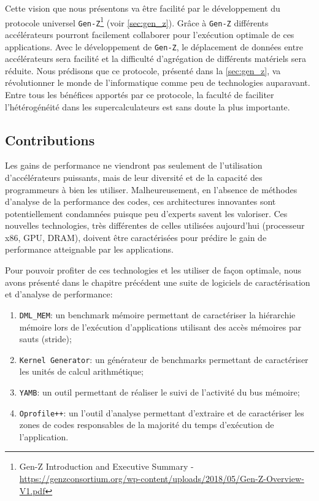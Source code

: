         
        Cette vision que nous présentons va être facilité par le développement du protocole universel \verb|Gen-Z|\footnote{Gen-Z Introduction and Executive Summary - \url{https://genzconsortium.org/wp-content/uploads/2018/05/Gen-Z-Overview-V1.pdf}} (voir \autoref{sec:gen_z}). Grâce à \verb|Gen-Z| différents accélérateurs pourront facilement collaborer pour l'exécution optimale de ces applications. Avec le développement de \verb=Gen-Z=, le déplacement de données entre accélérateurs sera facilité et la difficulté d'agrégation de différents matériels sera réduite. Nous prédisons que ce protocole, présenté dans la \autoref{sec:gen_z}, va révolutionner le monde de l'informatique comme peu de technologies auparavant. Entre tous les bénéfices apportés par ce protocole, la faculté de faciliter l'hétérogénéité dans les supercalculateurs est sans doute la plus importante. 

\subsection{Contributions}

       Les gains de performance ne viendront pas seulement de l'utilisation d'accélérateurs puissants, mais de leur diversité et de la capacité des programmeurs à bien les utiliser. Malheureusement, en l'absence de méthodes d'analyse de la performance des codes, ces architectures innovantes sont potentiellement condamnées puisque peu d'experts savent les valoriser. Ces nouvelles technologies, très différentes de celles utilisées aujourd'hui (processeur x86, GPU, DRAM), doivent être caractérisées pour prédire le gain de performance atteignable par les applications. 
          
          
        Pour pouvoir profiter de ces technologies et les utiliser de façon optimale, nous avons présenté dans le chapitre précédent une suite de logiciels de caractérisation et d'analyse de performance:
        \begin{enumerate}
            \item \texttt{DML\_MEM}: un \gls{benchmark} mémoire permettant de caractériser la hiérarchie mémoire lors de l'exécution d'applications utilisant des accès mémoires par sauts (\gls{stride});
            
            \item \texttt{Kernel Generator}: un générateur de benchmarks permettant de caractériser les unités de calcul arithmétique;
            
            \item \texttt{YAMB}: un outil permettant de réaliser le suivi de l'activité du bus mémoire;
            
            \item \texttt{Oprofile++}: un l'outil d'analyse permettant d'extraire et de caractériser les zones de codes responsables de la majorité du temps d'exécution de l'application. 
        \end{enumerate}

